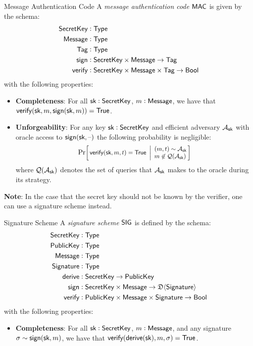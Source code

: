 \begin{definitiontoc}{Message Authentication Code}
    A \emph{message authentication code} ${\textsf{MAC}}$ is given by the schema:
    \begin{align*}
        {\textsf{SecretKey}} &: {\textsf{Type}} \\
        {\textsf{Message}}   &: {\textsf{Type}} \\
        {\textsf{Tag}}       &: {\textsf{Type}} \\
        {\textsf{sign}}      &: {\textsf{SecretKey}} \times {\textsf{Message}} \to {\textsf{Tag}} \\
        {\textsf{verify}}    &: {\textsf{SecretKey}} \times {\textsf{Message}} \times {\textsf{Tag}} \to {\textsf{Bool}}
    \end{align*}
    with the following properties:
    \begin{itemize}
        \item \textbf{Completeness}: For all ${\textsf{sk}} : {\textsf{SecretKey}}$, $m : {\textsf{Message}}$, we have that ${\textsf{verify}}({\textsf{sk}}, m, {\textsf{sign}}({\textsf{sk}}, m)) = {\textsf{True}}$.
        \item \textbf{Unforgeability}: For any key ${\textsf{sk}} : {\textsf{SecretKey}}$ and efficient adversary $\mathcal{A}_{\textsf{sk}}$ with oracle access to ${\textsf{sign}}({\textsf{sk}}, {\textrm{--}})$ the following probability is negligible:
            \[
                \Prob{
                    \verify(\sk, m, t) = \True
                }{
                    (m, t) \sim \mathcal{A}_\sk \\
                    m \not\in \mathcal{Q}(\mathcal{A}_\sk)
                }
            \]
            where $\mathcal{Q}(\mathcal{A}_{\textsf{sk}})$ denotes the set of queries that $\mathcal{A}_{\textsf{sk}}$ makes to the oracle during its strategy.
    \end{itemize}

    \textbf{Note}: In the case that the secret key should not be known by the verifier, one can use a signature scheme instead.
\end{definitiontoc}

\begin{definitiontoc}{Signature Scheme}
    A \emph{signature scheme} ${\textsf{SIG}}$ is defined by the schema:
    \begin{align*}
        {\textsf{SecretKey}}    &: {\textsf{Type}} \\
        {\textsf{PublicKey}}    &: {\textsf{Type}} \\
        {\textsf{Message}}      &: {\textsf{Type}} \\
        {\textsf{Signature}}    &: {\textsf{Type}} \\
        {\textsf{derive}}       &: {\textsf{SecretKey}} \to {\textsf{PublicKey}} \\
        {\textsf{sign}}         &: {\textsf{SecretKey}} \times {\textsf{Message}} \to \mathfrak{D}\langle{{\textsf{Signature}}}\rangle \\
        {\textsf{verify}}       &: {\textsf{PublicKey}} \times {\textsf{Message}} \times {\textsf{Signature}} \to {\textsf{Bool}}
    \end{align*}
    with the following properties:
    \begin{itemize}
        \item \textbf{Completeness}: For all ${\textsf{sk}} : {\textsf{SecretKey}}$, $m : {\textsf{Message}}$, and any signature $\sigma \sim {\textsf{sign}}({\textsf{sk}}, m)$, we have that ${\textsf{verify}}({\textsf{derive}}({\textsf{sk}}), m, \sigma) = {\textsf{True}}$.
    \end{itemize}
\end{definitiontoc}

